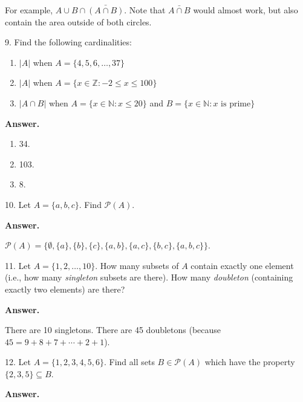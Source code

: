 \documentclass[10pt,]{book}
\theoremstyle{plain}
\theoremstyle{definition}
\theoremstyle{definition}
\theoremstyle{definition}
\numberwithin{equation}{section}
\def\N{\mathbb N}
\def\Z{\mathbb Z}
\def\pow{\mathcal P}
\def\st{:}
\begin{document}
\begin{exerciselist}
            For example, \(A \cup B \cap \bar{(A \cap B)}\). Note that \(\bar{A \cap B}\) would almost work, but also contain the area outside of both circles.
\item[9.]\hypertarget{exercise-9}{}
            Find the following cardinalities:
\leavevmode%
\begin{enumerate}[label=(\alph*)]
\item\hypertarget{li-108}{}\(|A|\) when \(A = \{4,5,6,\ldots,37\}\)\item\hypertarget{li-109}{}\(|A|\) when \(A = \{x \in \Z \st -2 \le x \le 100\}\)\item\hypertarget{li-110}{}\(|A \cap B|\) when \(A = \{x \in \N \st x \le 20\}\) and \(B = \{x \in \N \st x \mbox{ is prime} \}\)\end{enumerate}
\par\smallskip
\par\smallskip
\noindent\textbf{Answer.}\hypertarget{answer-9}{}\quad
\leavevmode%
\begin{enumerate}[label=(\alph*)]
\item\hypertarget{li-111}{}
                34.
\item\hypertarget{li-112}{}
                103.
\item\hypertarget{li-113}{}
                8.
\end{enumerate}
\item[10.]\hypertarget{exercise-10}{}
            Let \(A = \{a, b, c\}\). Find \(\pow(A)\).
\par\smallskip
\par\smallskip
\noindent\textbf{Answer.}\hypertarget{answer-10}{}\quad

            \(\pow(A) = \{\emptyset, \{a\}, \{b\}, \{c\}, \{a,b\}, \{a,c\}, \{b,c\}, \{a,b,c\}\}\).
\item[11.]\hypertarget{exercise-11}{}
            Let \(A = \{1,2,\ldots, 10\}\). How many subsets of \(A\) contain exactly one element (i.e., how many \emph{singleton} subsets are there). How many \emph{doubleton} (containing exactly two elements) are there?
\par\smallskip
\par\smallskip
\noindent\textbf{Answer.}\hypertarget{answer-11}{}\quad

            There are 10 singletons. There are 45 doubletons (because \(45 = 9+8+7+\cdots+2+1\)).
\item[12.]\hypertarget{exercise-12}{}
            Let \(A = \{1,2,3,4,5,6\}\). Find all sets \(B \in \pow(A)\) which have the property \(\{2,3,5\} \subseteq B\).
\par\smallskip
\par\smallskip
\noindent\textbf{Answer.}\hypertarget{answer-12}{}\quad


\end{exerciselist}
\end{document}
